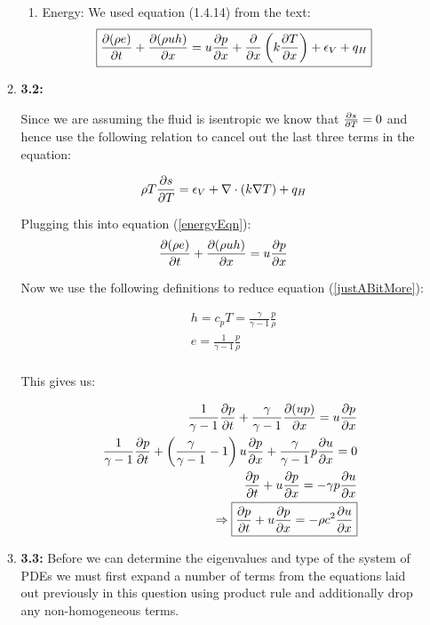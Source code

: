 \documentclass{article}
\begin{document}
\begin{enumerate}
\begin{enumerate}
\begin{enumerate}
\item Energy:
We used equation (1.4.14) from the text:
\begin{equation}
\boxed{\frac{\partial (\rho e)}{\partial t} + \frac{\partial (\rho u h)}{\partial x} = u \frac{\partial p}{\partial x} + \frac{\partial}{\partial x}\left(k \frac{\partial T}{\partial x} \right)+\epsilon_V + q_H}
\label{energyEqn}
\end{equation}

\end{enumerate}
\item \textbf{3.2:}

Since we are assuming the fluid is isentropic we know that $\frac{\partial s}{\partial T} = 0$ and hence use the following relation to cancel out the last three terms in the equation:

\begin{equation}
\rho T \frac{\partial s}{\partial T} = \epsilon_V+\nabla\cdot(k\nabla T)+q_H
\end{equation}

Plugging this into equation (\ref{energyEqn}):
\begin{equation}
\frac{\partial (\rho e)}{\partial t} + \frac{\partial (\rho u h)}{\partial x} = u \frac{\partial p}{\partial x}
\label{justABitMore}
\end{equation}

Now we use the following definitions to reduce equation (\ref{justABitMore}):

\begin{eqnarray}
&&h = c_pT = \frac{\gamma}{\gamma-1} \frac{p}{\rho}\nonumber \\
&&e = \frac{1}{\gamma-1} \frac{p}{\rho}\nonumber \\
\end{eqnarray}

This gives us:

\begin{eqnarray}
&& \frac{1}{\gamma-1}\frac{\partial p}{\partial t} + \frac{\gamma}{\gamma-1} \frac{\partial (up)}{\partial x} = u \frac{\partial p}{\partial x}\nonumber \\
&& \frac{1}{\gamma-1}\frac{\partial p}{\partial t} + \left(\frac{\gamma}{\gamma-1}-1\right)u \frac{\partial p}{\partial x} + \frac{\gamma}{\gamma-1}p\frac{\partial u}{\partial x}= 0\nonumber \\
&& \frac{\partial p}{\partial t} + u \frac{\partial p}{\partial x} = -\gamma p \frac{\partial u}{\partial x} \nonumber \\
&& \Rightarrow \boxed{\frac{\partial p}{\partial t} + u \frac{\partial p}{\partial x} = -\rho c^2 \frac{\partial u}{\partial x}}
\end{eqnarray}

\item \textbf{3.3:}
Before we can determine the eigenvalues and type of the system of PDEs we must first expand a number of terms from the equations laid out previously in this question using product rule and additionally drop any non-homogeneous terms.  


\end{enumerate}
\end{enumerate}
\end{document}
